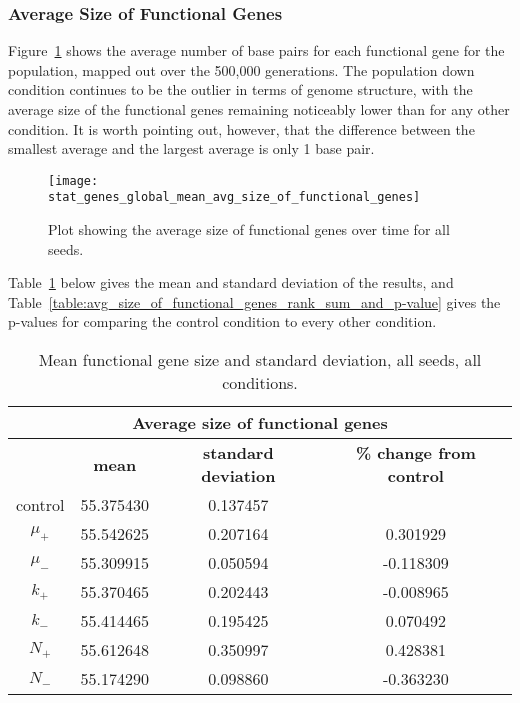 \subsubsection{Average Size of Functional Genes}\label{sec:average_size_functional_genes}
Figure~\ref{fig:mean_functional_gene_size} shows the average number of base pairs for each functional gene for the population, mapped out over the 500,000 generations. The population down condition continues to be the outlier in terms of genome structure, with the average size of the functional genes remaining noticeably lower than for any other condition. It is worth pointing out, however, that the difference between the smallest average and the largest average is only 1 base pair. 
\begin{figure}[H]
	\centering
	\texttt{[image: stat\_genes\_global\_mean\_avg\_size\_of\_functional\_genes]}
	\caption[Average size of functional genes]{Plot showing the average size of functional genes over time for all seeds.}
	\label{fig:mean_functional_gene_size}
\end{figure}
Table~\ref{table:mean_functional_gene_size_and_std_dev} below gives the mean and standard deviation of the results, and Table~\ref{table:avg_size_of_functional_genes_rank_sum_and_p-value} gives the p-values for comparing the control condition to every other condition. 

\begin{table}[H]
	\centering
	\begin{tabular}{|c|c|c|c|}
		\hline
		\multicolumn{4}{c}{\Large \textbf{Average size of functional genes}} \\
		\hline
		& \textbf{mean} & \textbf{standard deviation} & \textbf{\% change from control} \\
		\hline
		control & 55.375430 & 0.137457 & \textemdash \\ 
		\hline
		$\mu_+$ & 55.542625 & 0.207164 & 0.301929 \\ 
		\hline
		$\mu_-$ & 55.309915 & 0.050594 & -0.118309 \\ 
		\hline
		$k_+$ & 55.370465 & 0.202443 & -0.008965 \\ 
		\hline
		$k_-$ & 55.414465 & 0.195425 & 0.070492 \\ 
		\hline
		$N_+$ & 55.612648 & 0.350997 & 0.428381 \\ 
		\hline
		$N_-$ & 55.174290 & 0.098860 & -0.363230 \\ 
		\hline
	\end{tabular}
	\caption[Mean functional gene size and standard deviation]{Mean functional gene size and standard deviation, all seeds, all conditions.}
	\label{table:mean_functional_gene_size_and_std_dev}
\end{table}

